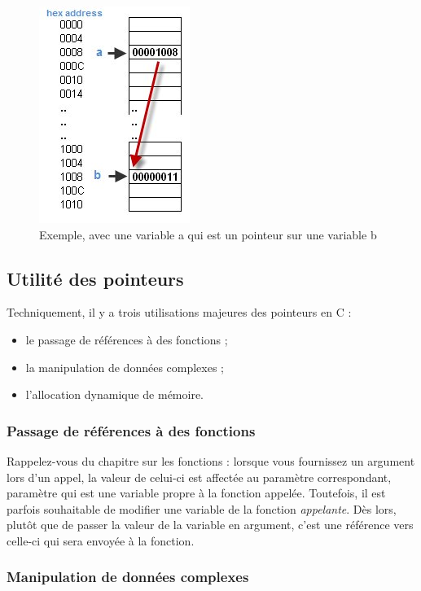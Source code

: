 \begin{figure}[htbp]
\centering
\includegraphics[scale=0.7]{images/pointeur.jpg}
\caption{Exemple, avec une variable a qui est un pointeur sur une
variable b}
\end{figure}

\subsection{Utilité des pointeurs}
\label{utilite-des-pointeurs}

Techniquement, il y a trois utilisations majeures des pointeurs en C :

\begin{itemize}
\item
  le passage de références à des fonctions ;
\item
  la manipulation de données complexes ;
\item
  l'allocation dynamique de mémoire.
\end{itemize}

\subsubsection{Passage de références à des fonctions}
\label{passage-de-references-a-des-fonctions}

Rappelez-vous du chapitre sur les fonctions : lorsque vous fournissez un
argument lors d'un appel, la valeur de celui-ci est affectée au
paramètre correspondant, paramètre qui est une variable propre à la
fonction appelée. Toutefois, il est parfois souhaitable de modifier une
variable de la fonction \emph{appelante}. Dès lors, plutôt que de passer
la valeur de la variable en argument, c'est une référence vers celle-ci
qui sera envoyée à la fonction.

\subsubsection{Manipulation de données complexes}
\label{manipulation-de-donnees-complexes}

